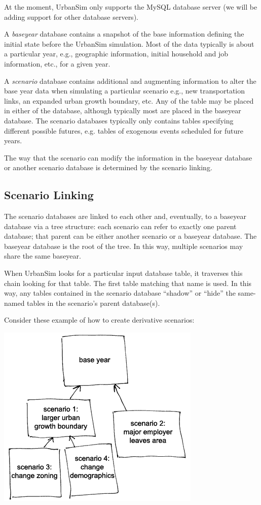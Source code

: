 At the moment, UrbanSim only supports the MySQL \mysqlindex database server (we will be
adding support for other database servers).

A \emph{baseyear} database contains a snapshot of the base
information defining the initial state before the UrbanSim
simulation. Most of the data typically is about a particular year,
e.g., geographic information, initial household and job information,
etc., for a given year.

A \emph{scenario} database contains additional and augmenting information to
alter the base year data when simulating a particular scenario e.g., new
transportation links, an expanded urban growth boundary, etc. Any of the table
may be placed in either of the database, although typically most are placed in
the baseyear database.  The scenario databases typically only contains tables
specifying different possible futures, e.g. tables of exogenous events
scheduled for future years.

The way that the scenario can modify the information in the baseyear database or
another scenario database is determined by the scenario linking.

\subsection{Scenario Linking}

The scenario databases are linked to each other and, eventually, to a baseyear
database via a tree structure: each scenario can refer to exactly one parent
database; that parent can be either another scenario or a baseyear database.
The baseyear database is the root of the tree.  In this way, multiple scenarios
may share the same baseyear.

When UrbanSim looks for a particular input database table, it traverses this
chain looking for that table.  The first table matching that name is used.  In
this way, any tables contained in the scenario database ``shadow'' or ``hide''
the same-named tables in the scenario's parent database(s).

Consider these example of how to create derivative scenarios:\\

\begin{center}
\includegraphics*{scenarios}
\end{center}

